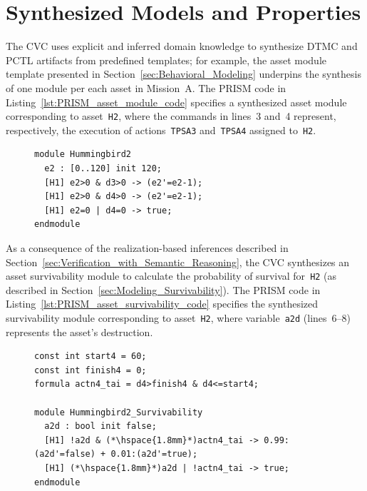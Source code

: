 \section{Synthesized Models and Properties}
\label{sec:Synthesized_Models_and_Properties}

The CVC uses explicit and inferred domain knowledge to synthesize DTMC and PCTL artifacts from predefined templates; for example, the asset module template presented in Section~\ref{sec:Behavioral_Modeling} underpins the synthesis of one module per each asset in Mission~A\@. The PRISM code in Listing~\ref{lst:PRISM_asset_module_code} specifies a synthesized asset module corresponding to asset~\texttt{H2}, where the commands in lines~3 and~4 represent, respectively, the execution of actions~\texttt{TPSA3} and~\texttt{TPSA4} assigned to~\texttt{H2}.

\begin{figure}[ht]
\begin{lstlisting}[caption={PRISM asset module code},label=lst:PRISM_asset_module_code]
module Hummingbird2
  e2 : [0..120] init 120;
  [H1] e2>0 & d3>0 -> (e2'=e2-1);
  [H1] e2>0 & d4>0 -> (e2'=e2-1);
  [H1] e2=0 | d4=0 -> true;
endmodule
\end{lstlisting}
\end{figure}

As a consequence of the realization-based inferences described in Section~\ref{sec:Verification_with_Semantic_Reasoning}, the CVC synthesizes an asset survivability module to calculate the probability of survival for~\texttt{H2} (as described in Section~\ref{sec:Modeling_Survivability}). The PRISM code in Listing~\ref{lst:PRISM_asset_survivability_code} specifies the synthesized survivability module corresponding to asset~\texttt{H2}, where variable~\texttt{a2d} (lines~6--8) represents the asset's destruction.

\begin{figure}[ht]
\begin{lstlisting}[caption={PRISM asset survivability code},label=lst:PRISM_asset_survivability_code]
const int start4 = 60;
const int finish4 = 0;
formula actn4_tai = d4>finish4 & d4<=start4;

module Hummingbird2_Survivability
  a2d : bool init false;
  [H1] !a2d & (*\hspace{1.8mm}*)actn4_tai -> 0.99:(a2d'=false) + 0.01:(a2d'=true);
  [H1] (*\hspace{1.8mm}*)a2d | !actn4_tai -> true;
endmodule
\end{lstlisting}
\end{figure}

